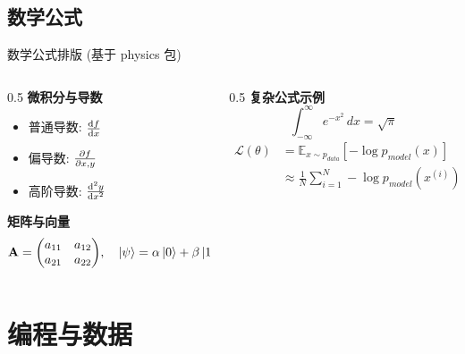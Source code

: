 \subsection{数学公式}
\begin{frame}{数学公式排版 (基于 physics 包)}
    \begin{columns}[c]
        \begin{column}{0.5\textwidth}
            \textbf{微积分与导数}
            \begin{itemize}
                \item 普通导数: $\dv{f}{x}$
                \item 偏导数: $\pdv{f}{x,y}$
                \item 高阶导数: $\dv[2]{y}{x}$
            \end{itemize}
            \vspace{1em}
            \textbf{矩阵与向量}
            \[
            \mathbf{A} = \mqty(
                a_{11} & a_{12} \\
                a_{21} & a_{22}
            ), \quad
            \ket{\psi} = \alpha \ket{0} + \beta \ket{1}
            \]
        \end{column}
        \begin{column}{0.5\textwidth}
            \textbf{复杂公式示例}
            \begin{equation}
                \int_{-\infty}^{\infty} e^{-x^2} \, dx = \sqrt{\pi}
            \end{equation}
            \begin{equation}
                \begin{aligned}
                    \mathcal{L}(\theta) &= \mathbb{E}_{x \sim p_{data}} [-\log p_{model}(x)] \\
                                        &\approx \frac{1}{N} \sum_{i=1}^N -\log p_{model}(x^{(i)})
                \end{aligned}
            \end{equation}
        \end{column}
    \end{columns}
\end{frame}


\section{编程与数据}

